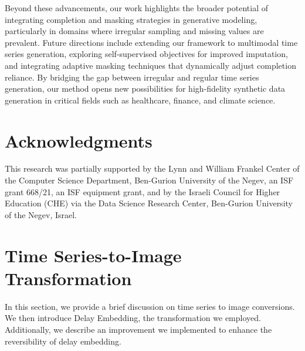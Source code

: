 \documentclass{article}
\theoremstyle{plain}
\theoremstyle{definition}
\theoremstyle{remark}
\begin{document}
Beyond these advancements, our work highlights the broader potential of integrating completion and masking strategies in generative modeling, particularly in domains where irregular sampling and missing values are prevalent. Future directions include extending our framework to multimodal time series generation, exploring self-supervised objectives for improved imputation, and integrating adaptive masking techniques that dynamically adjust completion reliance. By bridging the gap between irregular and regular time series generation, our method opens new possibilities for high-fidelity synthetic data generation in critical fields such as healthcare, finance, and climate science.


\section*{Acknowledgments}
This research was partially supported by the Lynn and William Frankel Center of the Computer Science Department, Ben-Gurion University of the Negev, an ISF grant 668/21, an ISF equipment grant, and by the Israeli Council for Higher Education (CHE) via the Data Science Research Center, Ben-Gurion University of the Negev, Israel.



\clearpage



\clearpage
\appendix

\section{Time Series-to-Image Transformation}
\label{app:ts2img}
In this section, we provide a brief discussion on time series to image conversions. We then introduce Delay Embedding, the transformation we employed. Additionally, we describe an improvement we implemented to enhance the reversibility of delay embedding.
\end{document}
